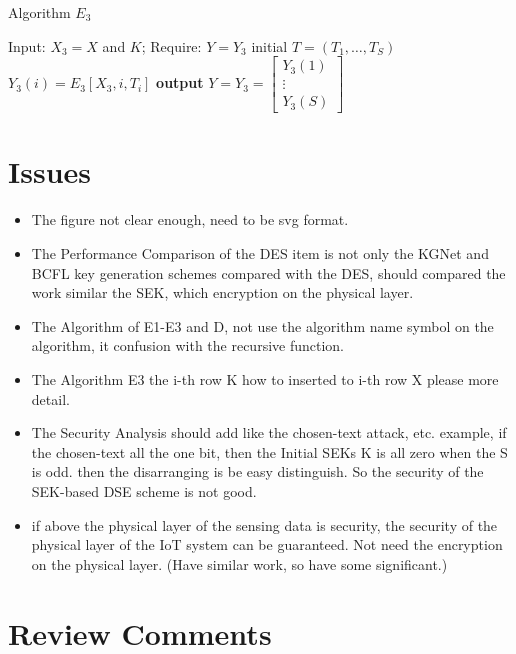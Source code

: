\documentclass[a4paper]{article}
\begin{document}
\begin{algorithm}
  \caption{Algorithm $E_3$}
  \begin{algorithmic}[1]
    \REQUIRE Input: $X_3=X$ and $K$; Require: $Y=Y_3$
    \STATE initial $T = (T_1, \ldots, T_S)$
    \STATE $Y_3(i) = E_3[X_3, i, T_i]$
    \ENDFOR
    \STATE \textbf{output} $Y = Y_3 =
    \begin{bmatrix}
      Y_3(1) \\
      \vdots \\
      Y_3(S)
    \end{bmatrix}$
  \end{algorithmic}
\end{algorithm}

\section{Issues}

\begin{itemize}
  \item The figure not clear enough, need to be svg format.
  \item The Performance Comparison of the DES item is not only the KGNet and BCFL key generation schemes compared with the DES, should compared the work similar the SEK, which encryption on the physical layer.
  \item The Algorithm of E1-E3 and D, not use the algorithm name symbol on the algorithm, it confusion with the recursive function.
  \item The Algorithm E3 the i-th row K how to inserted to i-th row X please more detail.
  \item The Security Analysis should add like the chosen-text attack, etc. example,  if the chosen-text all the one bit, then the Initial SEKs K is all zero when the S is odd. then the disarranging is be easy distinguish. So the security of the SEK-based DSE scheme is not good.
  \item if above the physical layer of the sensing data is security, the security of the physical layer of the IoT system can be guaranteed. Not need the encryption on the physical layer. (Have similar work, so have some significant.)
\end{itemize}

\section{Review Comments}
\end{document}
